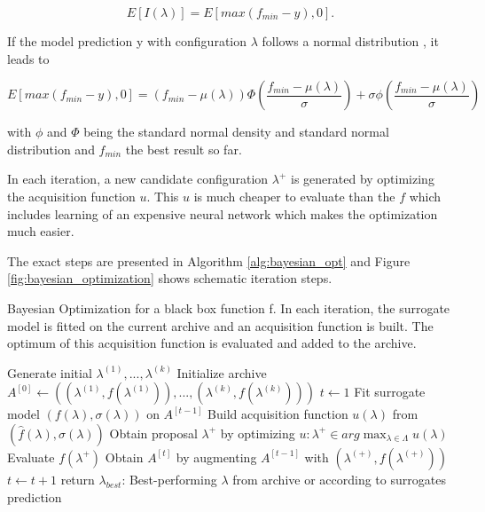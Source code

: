 \begin{equation}
	E[I(\lambda)] = E\left[max\left(f_{min}-y\right), 0\right].
\end{equation}

If the model prediction y with configuration $ \lambda $ follows a normal distribution \cite{feurer2019hyperparameter}, it leads to 

\begin{equation}
	E[max\left(f_{min}-y\right), 0] = \left(f_{min}-\mu(\lambda)\right) \Phi\left(\frac{f_{min}-\mu(\lambda)}{\sigma}\right) + \sigma \phi \left(\frac{f_{min}-\mu(\lambda)}{\sigma}\right)
\end{equation}

with $ \phi $ and $ \Phi $ being the standard normal density and standard normal distribution and $ f_{min} $ the best result so far. 


In each iteration, a new candidate configuration $ \lambda^+ $  is generated by optimizing the acquisition function $ u $. This $ u $ is much cheaper to evaluate than the $ f $ which includes learning of an expensive neural network which makes the optimization much easier.

The exact steps are presented in Algorithm \ref{alg:bayesian_opt} and Figure \ref{fig:bayesian_optimization} shows schematic iteration steps.

\begin{algorithm}[H]
	\caption{Bayesian Optimization for a black box function f. In each iteration, the surrogate model is fitted on the current archive and an acquisition function is built. The optimum of this acquisition function is evaluated and added to the archive.}
	\label{alg:bayesian_opt}
	\begin{algorithmic}
		\State Generate initial $\lambda^{(1)}, ..., \lambda^{(k)} $
		\State Initialize archive $A^{[0]} \gets \left(\left(\lambda^{(1)}, f\left(\lambda^{(1)}\right)\right), ..., \left(\lambda^{(k)}, f\left(\lambda^{(k)}\right)\right)\right)$
		\State $ t \gets 1 $ 
			\State Fit surrogate model $ \left(f(\lambda), \sigma(\lambda)\right) $ on $ A^{[t-1]} $
			\State Build acquisition function $ u(\lambda) $ from $ \left(\hat{f}\left(\lambda\right), \sigma(\lambda)\right) $
			\State Obtain proposal $ \lambda^{+} $ by optimizing $ u: \lambda^+ \in arg\max_{\lambda \in \Lambda} u(\lambda) $
			\State Evaluate $ f\left(\lambda^+\right)$
			\State Obtain $A^[t]$ by augmenting $ A^{[t-1]} $ with $ \left(\lambda^{(+)}, f\left(\lambda^{(+)}\right)\right) $
			\State $ t \gets t+1 $
		\EndWhile
		\State return $ \lambda_{best} $: Best-performing $\lambda$ from archive or according to surrogates prediction
	\end{algorithmic}
\end{algorithm}

